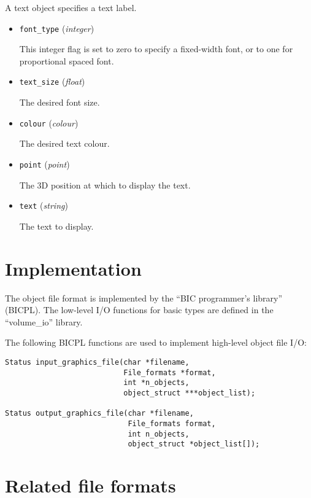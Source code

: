 \documentclass{article}
\newcommand{\kw}[1]{{\tt \mbox{#1}}}
\begin{document}
A text object specifies a text label.

\begin{itemize}

\item \kw{font\_type} ({\it integer})

This integer flag is set to zero to specify a fixed-width font, or to
one for proportional spaced font.

\item \kw{text\_size} ({\it float})

The desired font size.

\item \kw{colour} ({\it colour})

The desired text colour.

\item \kw{point} ({\it point})

The 3D position at which to display the text.

\item \kw{text} ({\it string})

The text to display.

\end{itemize}

\section{Implementation}

The object file format is implemented by the ``BIC programmer's
library'' (BICPL).  The low-level I/O functions for basic types are
defined in the ``volume\_io'' library.  

The following BICPL functions are used to implement high-level
object file I/O:

\begin{verbatim}
Status input_graphics_file(char *filename, 
                           File_formats *format,
                           int *n_objects, 
                           object_struct ***object_list);

Status output_graphics_file(char *filename, 
                            File_formats format,
                            int n_objects, 
                            object_struct *object_list[]);
\end{verbatim}

\section{Related file formats}
\end{document}
